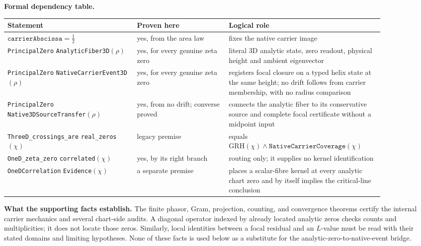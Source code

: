 \documentclass[11pt]{article}
\theoremstyle{definition}
\begin{document}
\medskip
\noindent\textbf{Formal dependency table.}
\begin{center}
\small
\renewcommand{\arraystretch}{1.15}
\begin{tabular}{p{0.31\linewidth}|p{0.22\linewidth}|p{0.35\linewidth}}
Statement & Proven here & Logical role\\
\hline
\(\texttt{carrierAbscissa}=\tfrac12\) & yes, from the area law & fixes the
native carrier image\\
\shortstack[l]{\texttt{PrincipalZero}\\
\texttt{AnalyticFiber3D}\((\rho)\)} & yes, for every genuine
zeta zero & literal 3D analytic state, zero readout, physical height and
ambient eigenvector\\
\shortstack[l]{\texttt{PrincipalZero}\\
\texttt{NativeCarrierEvent3D}\((\rho)\)} & yes, for every genuine
zeta zero & registers focal closure on a typed helix state at the same height;
no drift follows from carrier membership, with no radius comparison\\
\shortstack[l]{\texttt{PrincipalZero}\\
\texttt{Native3DSourceTransfer}\((\rho)\)} & yes, from no drift; converse proved &
connects the analytic fiber to its conservative source and complete focal
certificate without a midpoint input\\
\shortstack[l]{\texttt{ThreeD\_crossings\_are}\\
\texttt{real\_zeros}\((\chi)\)} & legacy premise &
equals \(\mathrm{GRH}(\chi)\wedge\texttt{NativeCarrierCoverage}(\chi)\)\\
\shortstack[l]{\texttt{OneD\_zeta\_zero}\\
\texttt{correlated}\((\chi)\)} & yes, by its right branch &
routing only; it supplies no kernel identification\\
\shortstack[l]{\texttt{OneDCorrelation}\\
\texttt{Evidence}\((\chi)\)} & a separate premise & places a
scalar-fibre kernel at every analytic chart zero and by itself implies the
critical-line conclusion\\
\end{tabular}
\end{center}

\medskip
\noindent\textbf{What the supporting facts establish.}  The finite phasor,
Gram, projection, counting, and convergence theorems certify the internal
carrier mechanics and several chart-side audits.  A diagonal operator indexed
by already located analytic zeros checks counts and multiplicities; it does
not locate those zeros.  Similarly, local identities between a focal residual
and an \(L\)-value must be read with their stated domains and limiting
hypotheses.  None of these facts is used below as a substitute for the
analytic-zero-to-native-event bridge.
\end{document}
